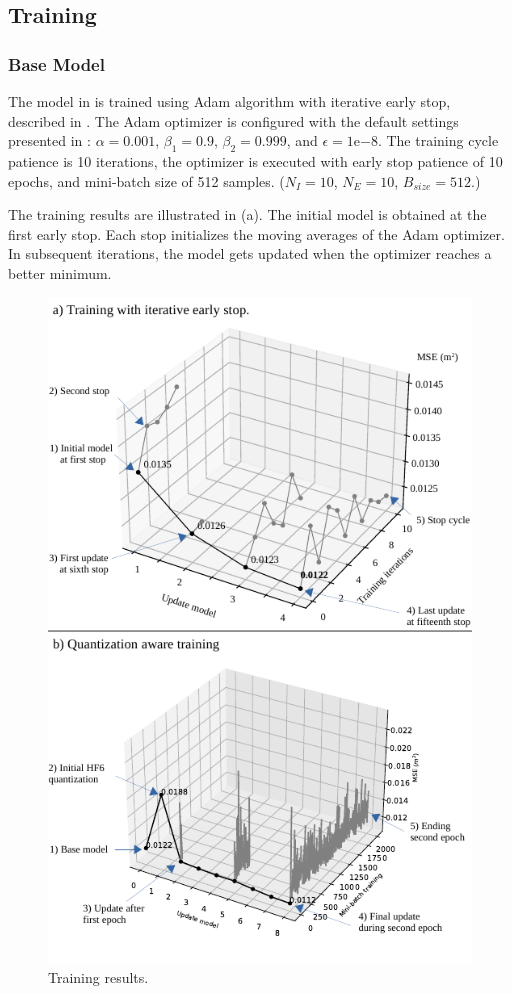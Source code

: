 \subsection{Training}
\subsubsection{Base Model}
The model in  is trained using Adam algorithm with iterative early stop, described in . The Adam optimizer is configured with the default settings presented in \cite{kingma2014adam}: $\alpha = 0.001$, $\beta_1 = 0.9$, $\beta_2 = 0.999$, and $\epsilon = 1\mathrm{e}{-8}$. The training cycle patience is 10 iterations, the optimizer is executed with early stop patience of 10 epochs, and mini-batch size of 512 samples. ($N_I = 10$, $N_E=10$, $B_{size}=512$.)

The training results are illustrated in (a). The initial model is obtained at the first early stop. Each stop initializes the moving averages of the Adam optimizer. In subsequent iterations, the model gets updated when the optimizer reaches a better minimum.

\begin{figure}[h!]
	\centering
	\includegraphics[width=\columnwidth]{../figures/histograms/training_and_quantization.pdf}
	\caption{Training results.}
	\label{fig:optimization}
\end{figure}


